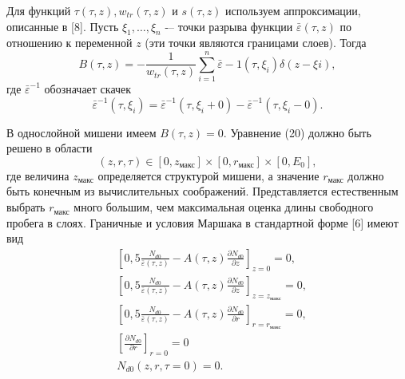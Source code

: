 Для функций \( \tau (\tau , z ), w_{tr}(\tau , z)\) и \(s(\tau,z)\) используем аппроксимации, описанные в [8].
Пусть \(\xi_1,\ldots,\xi_n\) -– точки разрыва функции \(\bar{\varepsilon}(\tau , z)\) по отношению к переменной \( z \) (эти точки являются границами слоев). Тогда
\begin{equation}
B(\tau, z) = −\frac{1}{w_{tr}(\tau, z)}\sum_{i=1}^{n} \bar{\varepsilon} −1 (\tau ,\xi_i ) \delta ( z − \xi i ) ,    
\end{equation}
где \(\bar{\varepsilon}^{−1}\) обозначает скачек
\begin{equation}
    \bar{\varepsilon}^{−1} (\tau ,\xi_i ) = \bar{\varepsilon}^{−1} (\tau,\xi_i + 0 ) − \bar{\varepsilon}^{−1} (\tau ,\xi_i − 0 ).
\end{equation}

В однослойной мишени имеем \( B(\tau,z)=0 \).
Уравнение (20) должно быть решено в области
\begin{equation}
    (z, r,\tau) \in [0, z_\text{макс}]\times [0, r_\text{макс} ]\times[0, E_0],    
\end{equation}
где величина \( z_\text{макс} \) определяется структурой мишени, а значение \( r_\text{макс} \) должно быть
конечным из вычислительных соображений. Представляется естественным выбрать \( r_\text{макс} \)
много большим, чем максимальная оценка длины свободного пробега в слоях.
Граничные и условия Маршака в стандартной форме [6] имеют вид
\begin{align}
& \left[0,5 \frac{N_{d0}}{\bar{\varepsilon}(\tau, z)} − A (\tau , z)\frac{\partial N_{d0}}{\partial z}\right]_{z=0} = 0 ,\\
& \left[0,5 \frac{N_{d0}}{\bar{\varepsilon}(\tau, z)} − A (\tau , z)\frac{\partial N_{d0}}{\partial z}\right]_{z=z_\text{макс}} = 0 ,\\
& \left[0,5 \frac{N_{d0}}{\bar{\varepsilon}(\tau, z)} − A (\tau , z)\frac{\partial N_{d0}}{\partial r}\right]_{r=r_\text{макс}} = 0,\\
& \left[\frac{\partial N_{d0}}{\partial r}\right]_{r=0} = 0\\
& N_{d0}(z, r, \tau=0 ) = 0.
\end{align}

